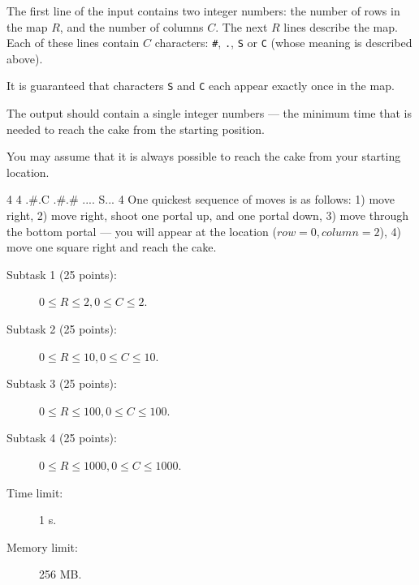 \documentclass{boi2014}
\newcommand{\constant}[1]{{\tt #1}}
\begin{document}
    \Input
    The first line of the input contains two integer numbers: the number of rows
    in the map $R$, and the number of columns $C$. The next $R$ lines describe
    the map. Each of these lines contain $C$ characters: \constant{\#},
    \constant{.}, \constant{S} or \constant{C} (whose meaning is described
    above).

    It is guaranteed that characters \constant{S} and \constant{C} each appear
    exactly once in the map.

    \Output
    The output should contain a single integer numbers --- the minimum time that
    is needed to reach the cake from the starting position.

    You may assume that it is always possible to reach the cake from your
    starting location.

    \Example
    \example
    {
        4 4\newline
        .\#.C\newline
        .\#.\#\newline
        ....\newline
        S...
    }
    {
        4
    }
    {
        One quickest sequence of moves is as follows: 1) move right, 2) move
        right, shoot one portal up, and one portal down, 3) move through the
        bottom portal --- you will appear at the location ($row = 0,
        column = 2$), 4) move one square right and reach the cake.
    }

    \Scoring

    \begin{description}
        \item[Subtask 1 (25 points):] $0 \le R \le 2, 0 \le C \le 2$.
        \item[Subtask 2 (25 points):] $0 \le R \le 10, 0 \le C \le 10$.
        \item[Subtask 3 (25 points):] $0 \le R \le 100, 0 \le C \le 100$.
        \item[Subtask 4 (25 points):] $0 \le R \le 1000, 0 \le C \le 1000$.
    \end{description}

    \Constraints

    \begin{description}
        \item[Time limit:] 1 s.
        \item[Memory limit:] 256 MB.
    \end{description}

\end{document}
